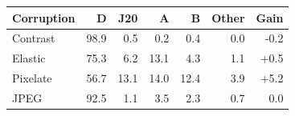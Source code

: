 \begin{tabular}{lrrrrrr}
\toprule
Corruption & D & J20 & A & B & Other & Gain \\
\midrule
Contrast & 98.9 & 0.5 & 0.2 & 0.4 & 0.0 & -0.2 \\
Elastic & 75.3 & 6.2 & 13.1 & 4.3 & 1.1 & +0.5 \\
Pixelate & 56.7 & 13.1 & 14.0 & 12.4 & 3.9 & +5.2 \\
JPEG & 92.5 & 1.1 & 3.5 & 2.3 & 0.7 & 0.0 \\
\bottomrule
\end{tabular}
